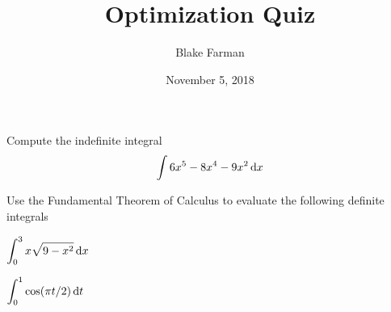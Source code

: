\documentclass[10pt]{amsart}
\title{Optimization Quiz}
\date{November 5, 2018}
\author{Blake Farman}
\begin{document}
\maketitle

\makenameslot

\begin{thm}
  Compute the indefinite integral
  \[\int 6x^5 - 8x^4 - 9x^2 \dif x\]
\end{thm}

\vspace{1in}

Use the Fundamental Theorem of Calculus to evaluate the following definite integrals
\begin{multicols}{2}
  \begin{thm}
    \(\displaystyle{\int_0^3 x\sqrt{9 - x^2}\dif x}\)
  \end{thm}
  \begin{thm}
    \(\displaystyle{\int_0^1\cos(\pi t/2)\dif t}\)
  \end{thm}
\end{multicols}
\end{document}
